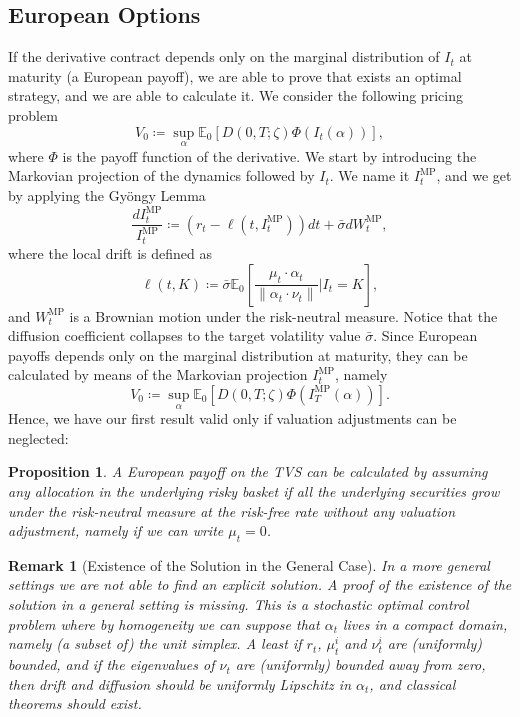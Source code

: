 \documentclass[11pt]{article}
\newtheorem{proposition}[theorem]{Proposition}
\newtheorem{remark}{Remark}[section]
\begin{document}
\subsection{European Options}
If the derivative contract depends only on the marginal distribution of $I_t$ at maturity (a European payoff), we are able to prove that exists an optimal strategy, and we are able to calculate it. We consider the following pricing problem
\begin{equation}
    V_0 \coloneqq \sup_\alpha \mathbb{E}_0\left[D(0,T;\zeta)\Phi(I_t(\alpha))\right],
\end{equation}
where $\Phi$ is the payoff function of the derivative. We start by introducing the Markovian projection of the dynamics followed by $I_t$. We name it $I_t^{\text{MP}}$, and we get by applying the Gy\"ongy Lemma
\begin{equation}
    \frac{dI_t^{\text{MP}}}{I_t^{\text{MP}}} \coloneqq \left(r_t - \ell \left(t,I_t^{\text{MP}}\right)\right)dt + \bar{\sigma}dW_t^{\text{MP}},
\label{eq:markovian_projection}\end{equation}
where the local drift is defined as
\begin{equation}
    \ell \left(t,K\right) \coloneqq \bar{\sigma} \mathbb{E}_0\left[\frac{\mu_t \cdot \alpha_t}{\|\alpha_t \cdot \nu_t \|}\bigg|I_t = K\right],
\end{equation}
and $W_t^{\text{MP}}$ is a Brownian motion under the risk-neutral measure. Notice that the diffusion coefficient collapses to the target volatility value $\bar{\sigma}$. Since European payoffs depends only on the marginal distribution at maturity, they can be calculated by means of the Markovian projection $I_t^{\text{MP}}$, namely
\begin{equation}
V_0 \coloneqq \sup_{\alpha} \mathbb{E}_0\left[D\left(0,T;\zeta\right)\Phi\left(I_T^{\text{MP}}\left(\alpha\right)\right)\right].
\end{equation}
Hence, we have our first result valid only if valuation adjustments can be neglected:
\begin{proposition}
A European payoff on the TVS can be calculated by assuming any allocation in the underlying risky basket if all the underlying
securities grow under the risk-neutral measure at the risk-free rate without any valuation adjustment, namely if we can write $\mu_t=0$.
\end{proposition}
\begin{remark}[Existence of the Solution in the General Case]
In a more general settings we are not able to find an explicit solution. A proof of the existence of the solution in a general setting is missing. This is a stochastic optimal control problem where by homogeneity we can suppose that $\alpha_t$ lives in a compact domain, namely (a subset of) the unit simplex. A least if $r_t$, $\mu^i_t$ and $\nu^i_t$ are (uniformly) bounded, and if the eigenvalues of $\nu_t$ are (uniformly) bounded away from zero, then drift and diffusion should be uniformly Lipschitz in $\alpha_t$, and classical theorems should exist. 
\end{remark}
\end{document}
